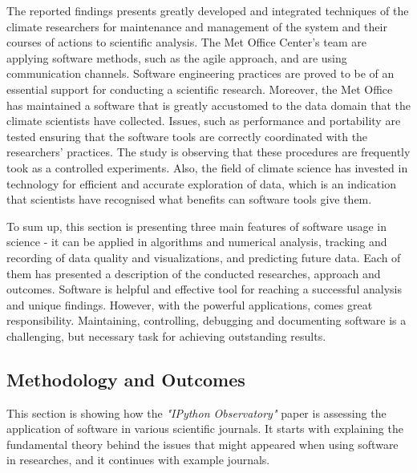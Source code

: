 The reported findings presents greatly developed and integrated techniques of the climate researchers for maintenance and management of the system and their courses of actions to scientific analysis. The Met Office Center's team are applying software methods, such as the agile approach, and are using communication channels. Software engineering practices are proved to be of an essential support for conducting a scientific research. Moreover, the Met Office has maintained a software that is greatly accustomed to the data domain that the climate scientists have collected. Issues, such as performance and portability are tested ensuring that the software tools are correctly coordinated with the researchers' practices. The study is observing that these procedures are frequently took as a controlled experiments. Also, the field of climate science has invested in technology for efficient and accurate exploration of data, which is an indication that scientists have recognised what benefits can software tools give them. \cite{easterbrook2009engineering}

To sum up, this section is presenting three main features of software usage in science - it can be applied in algorithms and numerical analysis, tracking and recording of data quality and visualizations, and predicting future data. Each of them has presented a description of the conducted researches, approach and outcomes. Software is helpful and effective tool for reaching a successful analysis and unique findings. However, with the powerful applications, comes great responsibility. Maintaining, controlling, debugging and documenting software is a challenging, but necessary task for achieving outstanding results. 

\subsection*{Methodology and Outcomes}

This section is showing how the \textit{"IPython Observatory"} paper is assessing the application of software in various scientific journals. It starts with explaining the fundamental theory behind the issues that might appeared when using software in researches, and it continues with example journals.

